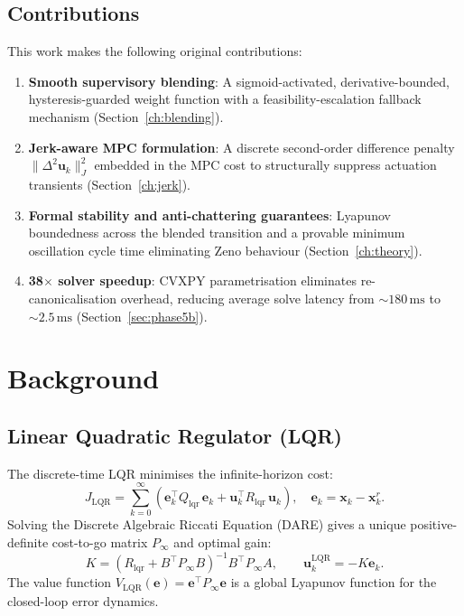 \documentclass[12pt,a4paper,oneside]{report}
\begin{document}
\section{Contributions}

This work makes the following original contributions:
\begin{enumerate}
  \item \textbf{Smooth supervisory blending}: A sigmoid-activated,
    derivative-bounded, hysteresis-guarded weight function with a
    feasibility-escalation fallback mechanism (Section~\ref{ch:blending}).
  \item \textbf{Jerk-aware MPC formulation}: A discrete second-order
    difference penalty \(\|\Delta^2\mathbf{u}_k\|_J^2\) embedded in the
    MPC cost to structurally suppress actuation transients
    (Section~\ref{ch:jerk}).
  \item \textbf{Formal stability and anti-chattering guarantees}: Lyapunov
    boundedness across the blended transition and a provable minimum
    oscillation cycle time eliminating Zeno behaviour
    (Section~\ref{ch:theory}).
  \item \textbf{38$\times$ solver speedup}: CVXPY parametrisation
    eliminates re-canonicalisation overhead, reducing average solve
    latency from \(\sim\!180\,\text{ms}\) to \(\sim\!2.5\,\text{ms}\)
    (Section~\ref{sec:phase5b}).
\end{enumerate}

\chapter{Background}\label{ch:background}

\section{Linear Quadratic Regulator (LQR)}

The discrete-time LQR minimises the infinite-horizon cost:
\begin{equation}
  J_{\mathrm{LQR}} = \sum_{k=0}^{\infty}
    \left(\mathbf{e}_k^\top Q_{\mathrm{lqr}}\,\mathbf{e}_k +
          \mathbf{u}_k^\top R_{\mathrm{lqr}}\,\mathbf{u}_k\right),\quad
  \mathbf{e}_k = \mathbf{x}_k - \mathbf{x}^r_k.
\end{equation}
Solving the Discrete Algebraic Riccati Equation (DARE) gives a unique
positive-definite cost-to-go matrix \(P_\infty\) and optimal gain:
\begin{equation}
  K = (R_{\mathrm{lqr}} + B^\top P_\infty B)^{-1}B^\top P_\infty A,\qquad
  \mathbf{u}^{\mathrm{LQR}}_k = -K\mathbf{e}_k.
\end{equation}
The value function \(V_{\mathrm{LQR}}(\mathbf{e}) = \mathbf{e}^\top P_\infty
\mathbf{e}\) is a global Lyapunov function for the closed-loop error dynamics.
\end{document}
